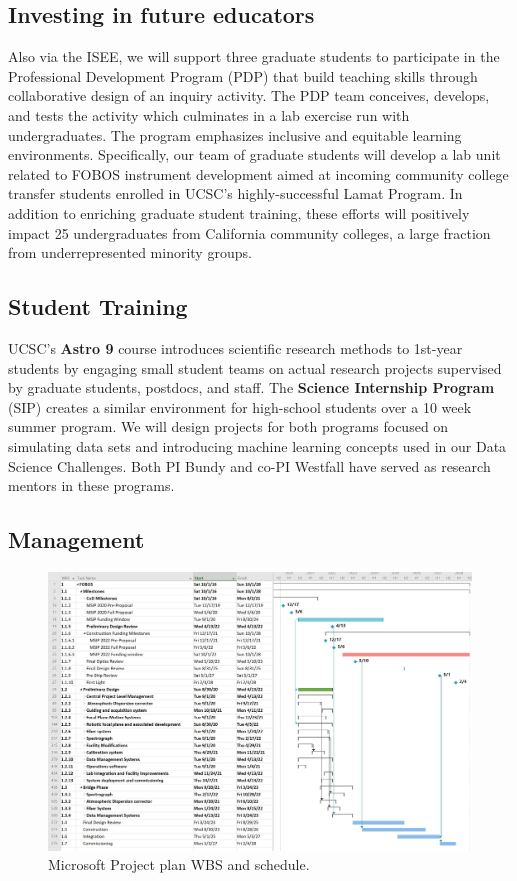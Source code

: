 \documentclass[oneside,11pt]{amsart}
\begin{document}
\subsection{Investing in future educators} Also via the ISEE, we will
support three graduate students to participate in the Professional
Development Program (PDP) that build teaching skills through
collaborative design of an inquiry activity.  The PDP team conceives,
develops, and tests the activity which culminates in a lab exercise
run with undergraduates. The program
emphasizes inclusive and equitable learning environments.  Specifically, our team of graduate
students will develop a lab unit related to FOBOS instrument development aimed at
incoming community college transfer students enrolled in UCSC's
highly-successful Lamat Program.  In addition to enriching graduate
student training, these efforts will positively impact 25
undergraduates from California community colleges, a large fraction
from underrepresented minority groups.

\subsection{Student Training} UCSC's {\bf Astro 9} course introduces scientific research methods to 1st-year students
by engaging small student teams on actual research projects supervised by graduate students,
postdocs, and staff.  The {\bf Science Internship Program} (SIP) creates a similar environment for high-school students
 over a 10 week summer program.  We will design projects for both programs focused on simulating data sets and
 introducing machine learning concepts used in our Data Science Challenges.  Both PI Bundy and co-PI Westfall have
 served as research mentors in these programs.


\subsection{Management}

\begin{figure}[h!]
%
\vskip -0.1in
%
\includegraphics[width=\textwidth]{figs/Pre-Proposal_Project_figure.jpg}
%
\caption{\small Microsoft Project plan WBS and schedule.}
%
\label{fig:gantt}
%
\end{figure}
\end{document}
